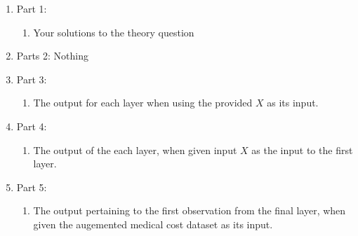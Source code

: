 \documentclass[12pt]{article}
\begin{document}
\begin{enumerate}
\item Part 1:
	\begin{enumerate}
	\item Your solutions to the theory question
	\end{enumerate}
\item Parts 2:  Nothing
\item Part 3:
	\begin{enumerate}
	\item The output for each layer when using the provided $X$ as its input.
	\end{enumerate}
\item Part 4:
	\begin{enumerate}
	\item The output of the each layer, when given input $X$ as the input to the first layer.
	\end{enumerate}
\item Part 5:
	\begin{enumerate}
	\item The output pertaining to the first observation from the final layer, when given the augemented medical cost dataset as its input.
	\end{enumerate}
\end{enumerate}
\end{document}

